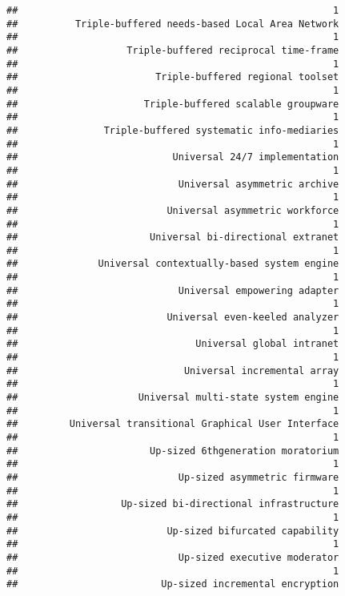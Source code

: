 \documentclass[
]{article}
\begin{document}
\begin{verbatim}
##                                                       1 
##          Triple-buffered needs-based Local Area Network 
##                                                       1 
##                   Triple-buffered reciprocal time-frame 
##                                                       1 
##                        Triple-buffered regional toolset 
##                                                       1 
##                      Triple-buffered scalable groupware 
##                                                       1 
##               Triple-buffered systematic info-mediaries 
##                                                       1 
##                           Universal 24/7 implementation 
##                                                       1 
##                            Universal asymmetric archive 
##                                                       1 
##                          Universal asymmetric workforce 
##                                                       1 
##                       Universal bi-directional extranet 
##                                                       1 
##              Universal contextually-based system engine 
##                                                       1 
##                            Universal empowering adapter 
##                                                       1 
##                          Universal even-keeled analyzer 
##                                                       1 
##                               Universal global intranet 
##                                                       1 
##                             Universal incremental array 
##                                                       1 
##                     Universal multi-state system engine 
##                                                       1 
##         Universal transitional Graphical User Interface 
##                                                       1 
##                       Up-sized 6thgeneration moratorium 
##                                                       1 
##                            Up-sized asymmetric firmware 
##                                                       1 
##                  Up-sized bi-directional infrastructure 
##                                                       1 
##                          Up-sized bifurcated capability 
##                                                       1 
##                            Up-sized executive moderator 
##                                                       1 
##                         Up-sized incremental encryption 

\end{verbatim}
\end{document}
